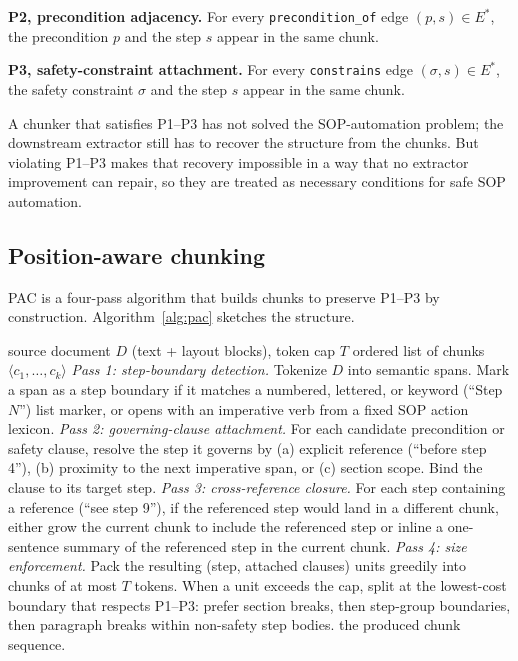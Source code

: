 \documentclass[fleqn,10pt]{wlscirep}
\begin{document}
\textbf{P2, precondition adjacency.} For every \texttt{precondition\_of}
edge $(p,s)\in E^{*}$, the precondition $p$ and the step $s$ appear in
the same chunk.

\textbf{P3, safety-constraint attachment.} For every
\texttt{constrains} edge $(\sigma,s)\in E^{*}$, the safety constraint
$\sigma$ and the step $s$ appear in the same chunk.

A chunker that satisfies P1--P3 has not solved the SOP-automation
problem; the downstream extractor still has to recover the structure
from the chunks. But violating P1--P3 makes that recovery impossible
in a way that no extractor improvement can repair, so they are treated
as necessary conditions for safe SOP automation.

\subsection*{Position-aware chunking}

PAC is a four-pass algorithm that builds chunks to preserve P1--P3 by
construction. Algorithm~\ref{alg:pac} sketches the structure.

\begin{algorithm}[ht]
\caption{Position-aware chunking (PAC).}
\label{alg:pac}
\begin{algorithmic}[1]
\Require source document $D$ (text + layout blocks), token cap $T$
\Ensure ordered list of chunks $\langle c_1,\dots,c_k\rangle$
\State \emph{Pass 1: step-boundary detection.} Tokenize $D$ into
       semantic spans. Mark a span as a step boundary if it matches a
       numbered, lettered, or keyword (``Step $N$'') list marker, or
       opens with an imperative verb from a fixed SOP action lexicon.
\State \emph{Pass 2: governing-clause attachment.} For each candidate
       precondition or safety clause, resolve the step it governs by
       (a) explicit reference (``before step 4''), (b) proximity to
       the next imperative span, or (c) section scope. Bind the clause
       to its target step.
\State \emph{Pass 3: cross-reference closure.} For each step
       containing a reference (``see step 9''), if the referenced step
       would land in a different chunk, either grow the current chunk
       to include the referenced step or inline a one-sentence summary
       of the referenced step in the current chunk.
\State \emph{Pass 4: size enforcement.} Pack the resulting (step,
       attached clauses) units greedily into chunks of at most $T$
       tokens. When a unit exceeds the cap, split at the lowest-cost
       boundary that respects P1--P3: prefer section breaks, then
       step-group boundaries, then paragraph breaks within non-safety
       step bodies.
\State \Return the produced chunk sequence.
\end{algorithmic}
\end{algorithm}
\end{document}
